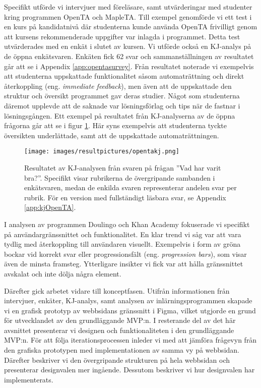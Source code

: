 Specifikt utförde vi intervjuer med föreläsare, samt utvärderingar med studenter kring programmen OpenTA och MapleTA. Till exempel genomförde vi ett test i en kurs på kandidatnivå där studenterna kunde använda OpenTA frivilligt genom att kursens rekommenderade uppgifter var inlagda i programmet. Detta test utvärderades med en enkät i slutet av kursen. Vi utförde också en KJ-analys på de öppna enkätsvaren. Enkäten fick 62 svar och sammanställningen av resultatet går att se i Appendix \ref{app:opentasurvey}. Från resultatet noterade vi exempelvis att studenterna uppskattade funktionalitet såsom automaträttning och direkt återkoppling (eng. \emph{immediate feedback}), men även att de uppskattade den struktur och översikt programmet gav deras studier. Något som studenterna däremot upplevde att de saknade var lösningsförlag och tips när de fastnar i lösningsgången. Ett exempel på resultatet från KJ-analyserna av de öppna frågorna går att se i figur \ref{fig:raket1}. Här syns exempelvis att studenterna tyckte översikten underlättade, samt att de uppskattade automaträttningen.

\begin{figure}[hbtp]
    \centering
    \texttt{[image: images/resultpictures/opentakj.png]}
    \caption{Resultatet av KJ-analysen från svaren på frågan ''Vad har varit bra?''. Specifikt visar rubrikerna de övergripande sambanden i enkätsvaren, medan de enkilda svaren representerar andelen svar per rubrik. För en version med fullständigt läsbara svar, se Appendix \ref{app:kjOpenTA}.}
    \label{fig:raket1}
\end{figure}




I analysen av programmen Doulingo och Khan Academy fokuserade vi specifikt på användargränssnittet och funktionalitet. En klar trend vi såg var att vara tydlig med återkoppling till användaren visuellt. Exempelvis i form av gröna bockar vid korrekt svar eller progressionsfält (eng. \emph{progression bars}), som visar även de minsta framsteg. Ytterligare insikter vi fick var att hålla gränssnittet avskalat och inte dölja några element. 

Därefter gick arbetet vidare till konceptfasen. Utifrån informationen från intervjuer, enkäter, KJ-analys, samt analysen av inlärningsprogrammen skapade vi en grafisk prototyp av webbsidans gränssnitt i Figma, vilket utgjorde en grund för utvecklandet av den grundläggande MVP:n. I resterande del av det här avsnittet presenterar vi designen och funktionaliteten i den grundläggande MVP:n. För att följa iterationsprocessen inleder vi med att jämföra frågevyn från den grafiska prototypen med implementationen av samma vy på webbsidan. Därefter beskriver vi den övergripande strukturen på hela webbsidan och presenterar designvalen mer ingående. Dessutom beskriver vi hur designvalen har implementerats.

